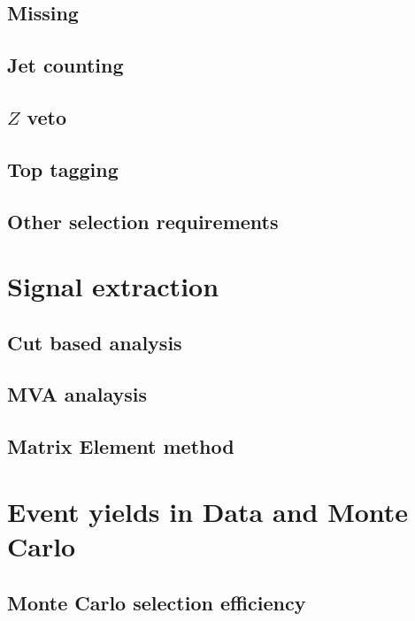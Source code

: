 \documentclass{cmspaper}
\begin{document}
  \subsection{Missing \et} 
    \label{sec:sel_met}
%    
  \subsection{Jet counting} 
    \label{sec:sel_jets}
%    
  \subsection{$Z$ veto}
    \label{sec:sel_zveto}
%    
  \subsection{Top tagging}
    \label{sec:sel_toptag}
%    
  \subsection{Other selection requirements}
    \label{sec:sel_other}
%    

\section{Signal extraction}
  \subsection{Cut based analysis}
    \label{sec:anal_cutbased}
%    
  \subsection{MVA analaysis}
    \label{sec:anal_mva}
%    
  \subsection{Matrix Element method}
    \label{sec:anal_me}
%    

\section{Event yields in Data and Monte Carlo}
  \subsection{Monte Carlo selection efficiency}
    \label{sec:mc_eff}
%    
\end{document}

